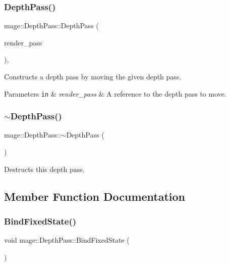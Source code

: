 \subsubsection{\texorpdfstring{Depth\+Pass()}{DepthPass()}\hspace{0.1cm}{\footnotesize\ttfamily [3/3]}}
{\footnotesize\ttfamily mage\+::\+Depth\+Pass\+::\+Depth\+Pass (\begin{DoxyParamCaption}\item[{\hyperlink{classmage_1_1_depth_pass}{Depth\+Pass} \&\&}]{render\+\_\+pass }\end{DoxyParamCaption})\hspace{0.3cm}{\ttfamily [default]}, {\ttfamily [noexcept]}}

Constructs a depth pass by moving the given depth pass.


\begin{DoxyParams}[1]{Parameters}
\mbox{\tt in}  & {\em render\+\_\+pass} & A reference to the depth pass to move. \\
\hline
\end{DoxyParams}
\hypertarget{classmage_1_1_depth_pass_adc89d5da94b42294316d4ad1dfa09eb4}{}\label{classmage_1_1_depth_pass_adc89d5da94b42294316d4ad1dfa09eb4} 
\subsubsection{\texorpdfstring{$\sim$\+Depth\+Pass()}{~DepthPass()}}
{\footnotesize\ttfamily mage\+::\+Depth\+Pass\+::$\sim$\+Depth\+Pass (\begin{DoxyParamCaption}{ }\end{DoxyParamCaption})\hspace{0.3cm}{\ttfamily [default]}}

Destructs this depth pass. 

\subsection{Member Function Documentation}
\hypertarget{classmage_1_1_depth_pass_ae456ab7e6818e86ab2c09338652c9be0}{}\label{classmage_1_1_depth_pass_ae456ab7e6818e86ab2c09338652c9be0} 
\subsubsection{\texorpdfstring{Bind\+Fixed\+State()}{BindFixedState()}}
{\footnotesize\ttfamily void mage\+::\+Depth\+Pass\+::\+Bind\+Fixed\+State (\begin{DoxyParamCaption}{ }\end{DoxyParamCaption})}

